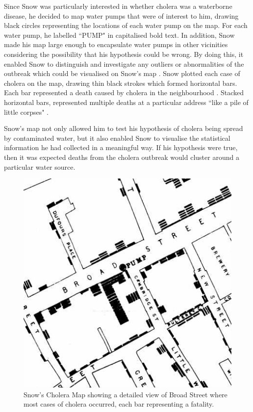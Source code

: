 \documentclass[12pt]{article}
\begin{document}
Since Snow was particularly interested in whether cholera was a waterborne disease, he decided to map water pumps that were of interest to him, drawing black circles representing the locations of each water pump on the map. For each water pump, he labelled ``PUMP" in capitalised bold text. In addition, Snow made his map large enough to encapsulate water pumps in other vicinities considering the possibility that his hypothesis could be wrong. By doing this, it enabled Snow to distinguish and investigate any outliers or abnormalities of the outbreak which could be visualised on Snow's map \cite{blog}. Snow plotted each case of cholera on the map, drawing thin black strokes which formed horizontal bars. Each bar represented a death caused by cholera in the neighbourhood \cite{tedtalk}. Stacked horizontal bars, represented multiple deaths at a particular address ``like a pile of little corpses" \cite{blog}.

Snow's map not only allowed him to test his hypothesis of cholera being spread by contaminated water, but it also enabled Snow to visualise the statistical information he had collected in a meaningful way. If his hypothesis were true, then it was expected deaths from the cholera outbreak would cluster around a particular water source. 

\begin{figure}
\centering
\includegraphics[scale=0.8]{snow_map_detail}
\caption{Snow's Cholera Map showing a detailed view of Broad Street where most cases of cholera occurred, each bar representing a fatality. }
\label{fig:snow}
\end{figure}
\end{document}
